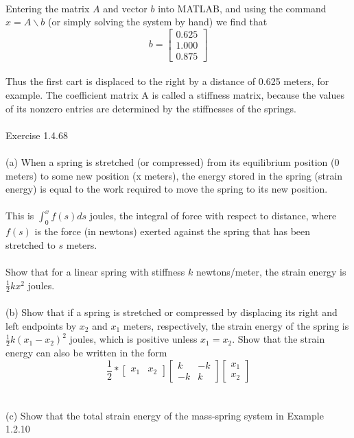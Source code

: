 \documentclass{article}
\begin{document}
	\\
	Entering the matrix $A$ and vector $b$ into MATLAB, and using the command $x = A\backslash b$ (or simply solving the system by hand) we find that 
	$$b = \begin{bmatrix}0.625\\1.000\\0.875\end{bmatrix}$$
	\\
	Thus the first cart is displaced to the right by a distance of 0.625 meters, for example. The coefficient matrix A is called a stiffness matrix, because the values of its nonzero entries are determined by the stiffnesses of the springs.
	\\
	\\	
	Exercise 1.4.68\\
	\\
	(a) When a spring is stretched (or compressed) from its equilibrium position (0 
	meters) to some new position (x meters), the energy stored in the spring (strain 
	energy) is equal to the work required to move the spring to its new position.\\
	\\ 
	This is $\int_{0}^{x}{f(s)ds}$ joules, the integral of force with respect to distance, where 
	$f(s)$ is the force (in newtons) exerted against the spring that has been stretched 
	to $s$ meters.\\
	\\
	Show that for a linear spring with stiffness $k$ newtons/meter, the 
	strain energy is $\frac{1}{2}kx^2$ joules.\\ 
	\\
	(b) Show that if a spring is stretched or compressed by displacing its right and left 
	endpoints by $x_2$ and $x_1$ meters, respectively, the strain energy of the spring is 
	$\frac{1}{2}k(x_1 - x_2)^2$ joules, which is positive unless $x_1 = x_2$. Show that the strain 
	energy can also be written in the form
	$$\frac{1}{2} * \begin{bmatrix}x_1&x_2\end{bmatrix} \begin{bmatrix}k&-k\\-k&k\end{bmatrix} \begin{bmatrix}x_1\\x_2\end{bmatrix}$$\\
	\\
	(c) Show that the total strain energy of the mass-spring system in Example 1.2.10 
\end{document}
